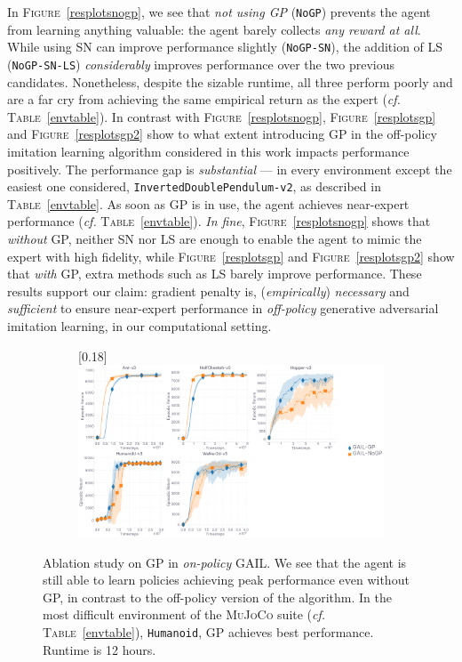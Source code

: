 In \textsc{Figure}~\ref{resplotsnogp}, we see that \emph{not using GP} (\texttt{NoGP})
prevents the agent
from learning anything valuable: the agent barely collects \emph{any reward at all}.
While using SN can improve performance slightly (\texttt{NoGP-SN}),
the addition of LS (\texttt{NoGP-SN-LS})
\emph{considerably} improves performance over the two previous candidates.
Nonetheless, despite the sizable runtime, all three perform poorly
and are a far cry from achieving the same empirical return as the expert
(\textit{cf.} \textsc{Table}~\ref{envtable}).
In contrast with \textsc{Figure}~\ref{resplotsnogp},
\textsc{Figure}~\ref{resplotsgp} and \textsc{Figure}~\ref{resplotsgp2}
show to what extent introducing GP in the off-policy imitation learning algorithm
considered in this work impacts performance positively.
The performance gap is \emph{substantial}
--- in every environment except the easiest one considered, \texttt{InvertedDoublePendulum-v2},
as described in \textsc{Table}~\ref{envtable}.
As soon as GP is in use, the agent achieves near-expert performance
(\textit{cf.} \textsc{Table}~\ref{envtable}).
\textit{In fine}, \textsc{Figure}~\ref{resplotsnogp} shows that
\emph{without} GP, neither SN nor LS are enough to enable the agent
to mimic the expert with high fidelity,
while \textsc{Figure}~\ref{resplotsgp} and \textsc{Figure}~\ref{resplotsgp2}
show that \emph{with} GP,
extra methods such as LS barely improve performance.
These results support our claim: gradient penalty is, (\emph{empirically})
\emph{necessary} and \emph{sufficient} to ensure near-expert performance in
\emph{off-policy} generative adversarial imitation learning,
in our computational setting.

\begin{figure}
  \center
  \begin{subfigure}[t]{0.99\textwidth}
    \center\scalebox{0.18}[0.18]{\includegraphics{Plots/fig04_gail_sn_nols_5envs/plots_eval_env_ret_plot.pdf}}
  \end{subfigure}
  \caption{
  Ablation study on GP
  in \emph{on-policy} GAIL.
  We see that the agent is still able to learn policies achieving peak performance
  even without GP, in contrast to the off-policy version of the algorithm.
  In the most difficult environment of the \textsc{MuJoCo} suite
  (\textit{cf.} \textsc{Table}~\ref{envtable}),
  \texttt{Humanoid}, GP achieves best performance.
  Runtime is 12 hours.}
  \label{resplotsgail}
\end{figure}

